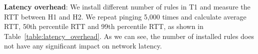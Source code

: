  \textbf{Latency overhead}: We install different number of \sysname{} rules in T1 and measure the RTT between H1 and H2. We repeat pinging 5,000 times and calculate average RTT, 50th percentile RTT and 99th percentile RTT, as shown in Table~\ref{table:latency_overhead}. As we can see, the number of installed rules does not have any significant impact on network latency.


%
%
%	
%
%
%
%
%
%  
%
%
